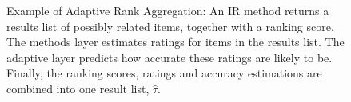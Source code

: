 \begin{figure}[t]
  \vspace{1em}
  \caption[Example of Adaptive Rank Aggregation]{
    Example of Adaptive Rank Aggregation: 
    An IR method returns a results list of possibly related items, together with a ranking score.
    The methods layer estimates ratings for items in the results list.
    The adaptive layer predicts how accurate these ratings are likely to be.
    Finally, the ranking scores, ratings and accuracy estimations are combined
    into one result list, $\hat{\tau}$.
  }
  \label{fig:adaptiverank}
\end{figure}
